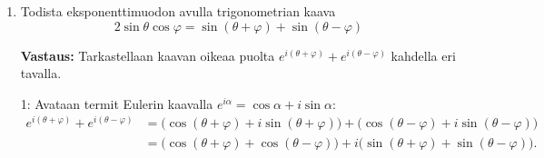 \documentclass[a4paper,12pt]{article}
\begin{document}
\begin{enumerate}
Tarkastellaan lukua $e^{i2\varphi}$ toisella tavalla:
\begin{equation*}
    e^{i2\varphi}=\left(e^{i\varphi}\right)^2=(\cos\varphi+i\sin\varphi)^2.
\end{equation*}
Avataan jälkimmäinen lauseke:
\begin{align*}
    (\cos\varphi+i\sin\varphi)^2 &= (\cos\varphi)^2 + 2\cos\varphi(i\sin\varphi) + (i\sin\varphi)^2 \\
    &= \cos^2\varphi + i(2\sin\varphi\cos\varphi) + i^2\sin^2\varphi \\
    &= (\cos^2\varphi - \sin^2\varphi) + i(2\sin\varphi\cos\varphi).
\end{align*}
Koska meillä on nyt kaksi lauseketta, jotka molemmat kuvaavat samaa kompleksilukua $e^{i2\varphi}$, niiden täytyy olla yhtä suuret keskenään:
\begin{equation*}
    \cos(2\varphi)+i\sin(2\varphi)=(\cos^2\varphi- \sin^2\varphi)+i(2\sin\varphi\cos\varphi).
\end{equation*}
Nyt kun vertaamme näiden yhtälöiden reaaliosia, saadaan:
\begin{equation*}
    \cos(2\varphi)=\cos^2\varphi-\sin^2\varphi.
\end{equation*}
Kaava on näin todistettu oikeaksi.

\item Todista eksponenttimuodon avulla trigonometrian kaava
\[
2\sin \theta\cos \varphi=\sin(\theta+\varphi)+\sin(\theta-\varphi)
\]

\textbf{Vastaus:} Tarkastellaan kaavan oikeaa puolta $e^{i(\theta+\varphi)} + e^{i(\theta-\varphi)}$ kahdella eri tavalla. 

1: Avataan termit Eulerin kaavalla $e^{i\alpha} = \cos\alpha + i\sin\alpha$:
\begin{align*}
    e^{i(\theta+\varphi)} + e^{i(\theta-\varphi)} &= \big(\cos(\theta+\varphi) + i\sin(\theta+\varphi)\big) + \big(\cos(\theta-\varphi) + i\sin(\theta-\varphi)\big) \\
    &= \big(\cos(\theta+\varphi) + \cos(\theta-\varphi)\big) + i\big(\sin(\theta+\varphi) + \sin(\theta-\varphi)\big).
\end{align*}


\end{enumerate}
\end{document}
